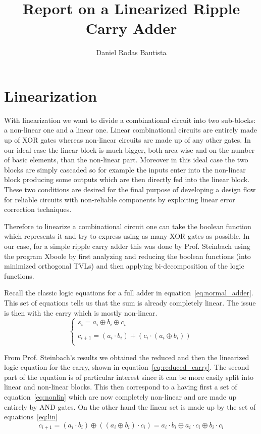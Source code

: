 \documentclass{article}
\title{Report on a Linearized Ripple Carry Adder}
\author{Daniel Rodas Bautista}%
\begin{document}
\maketitle
\section{Linearization}

With linearization we want to divide a combinational circuit into two sub-blocks: a non-linear one and a linear one. Linear combinational circuits are entirely made up of XOR gates whereas non-linear circuits are made up of any other gates. In our ideal case the linear block is much bigger, both area wise and on the number of basic elements, than the non-linear part. Moreover in this ideal case the two blocks are simply cascaded so for example the inputs enter into the non-linear block producing some outputs which are then directly fed into the linear block. These two conditions are desired for the final purpose of developing a design flow for reliable circuits with non-reliable components by exploiting linear error correction techniques.  

Therefore to linearize a combinational circuit one can take the boolean function which represents it and try to express using as many XOR gates as possible. In our case, for a simple ripple carry adder this was done by Prof. Steinbach using the program Xboole\cite{steinbach_xboole} by first analyzing  and reducing the boolean functions (into minimized orthogonal TVLs) and then applying bi-decomposition of the logic  functions\cite{steinbach_bidecomposition}.  

Recall the classic logic equations for a full adder in equation~\ref{eq:normal_adder}. This set of equations tells us that the  sum is already completely linear. The issue is then with the carry which is mostly non-linear. 
\begin{equation}
        \left\{
\begin{array}{l}
        s_i = a_i \oplus b_i \oplus c_{i} \\
        \\
        c_{i+1} = (a_i \cdot b_i ) + ( c_i \cdot (a_i \oplus b_i) ) \\
\end{array}
        \right.
\label{eq:normal_adder}
\end{equation}

From Prof. Steinbach's results we obtained the reduced and then the linearized logic equation for the carry, shown in equation~\ref{eq:reduced_carry}. The second part of the equation is of particular interest since it can be more easily split into linear and non-linear blocks. This then correspond to a having first a set of equation~\ref{eq:nonlin} which are now completely non-linear and are made up entirely by AND gates. On the other hand the linear set is made up by the set of equations~\ref{eq:lin}
\begin{equation}
c_{i+1} = (a_i \cdot b_i ) \oplus ( ( a_i \oplus b_i ) \cdot c_i ) = a_i \cdot b_i \oplus a_i \cdot c_i \oplus b_i \cdot c_i 
\label{eq:reduced_carry}
\end{equation}
\end{document}
